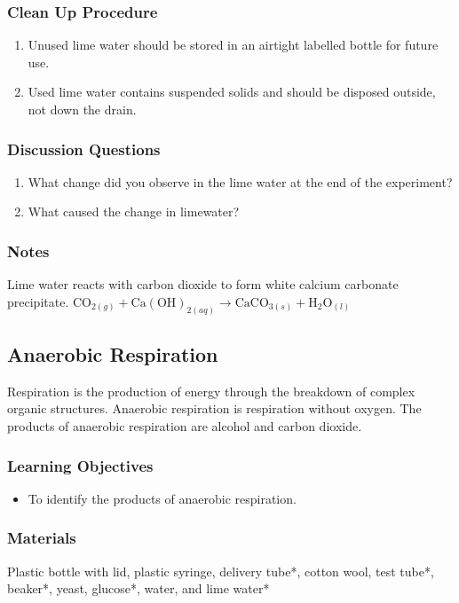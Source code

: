 \subsubsection*{Clean Up Procedure}
\begin{enumerate}
\item{Unused lime water should be stored in an airtight labelled bottle for future use.}
\item{Used lime water contains suspended solids and should be disposed outside, not down the drain.}
\end{enumerate}

\subsubsection*{Discussion Questions}
\begin{enumerate}
\item{What change did you observe in the lime water at the end of the experiment?}
\item{What caused the change in limewater?}
\end{enumerate}

\subsubsection*{Notes}
Lime water reacts with carbon dioxide to form white calcium carbonate precipitate.
$\mathrm{CO}_{2(g)} + \mathrm{Ca(OH)}_{2(aq)} \longrightarrow \mathrm{CaCO}_{3(s)} + \mathrm{H}_2\mathrm{O}_{(l)}$

\subsection{Anaerobic Respiration}

Respiration is the production of energy through the breakdown of complex organic structures. Anaerobic respiration is respiration without oxygen. The products of anaerobic respiration are alcohol and carbon dioxide.

\subsubsection*{Learning Objectives}
\begin{itemize}
\item{To identify the products of anaerobic respiration.}
\end{itemize}

\subsubsection*{Materials}
Plastic bottle with lid, plastic syringe, delivery tube*, cotton wool, test tube*, beaker*, yeast, glucose*, water, and lime water*

